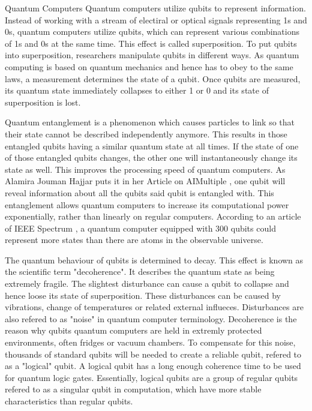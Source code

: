 \documentclass[aps,preprintnumbers,twocolumn]{revtex4}
\begin{document}
\begin{section}{Quantum Computers}
Quantum computers utilize qubits to represent information. 
Instead of working with a stream of electiral or optical signals representing 1s and 0s, 
quantum computers utilize qubits, which can represent various combinations of 1s and 0s at the same time. 
This effect is called superposition. To put qubits into superposition, 
researchers manipulate qubits in different ways. As quantum computing is based on quantum mechanics and hence has to obey to the same laws, 
a measurement determines the state of a qubit. Once qubits are measured, 
its quantum state immediately collapses to either 1 or 0 and its state of superposition is lost.

Quantum entanglement is a phenomenon which causes particles to link so that their state cannot be described independently anymore.
This results in those entangled qubits having a similar quantum state at all times.
If the state of one of those entangled qubits changes,
the other one will instantaneously change its state as well. This improves the processing speed of quantum computers. As Alamira Jouman Hajjar puts it in her Article on AIMultiple \cite{AIMultiple}, one qubit will reveal information about all the qubits said qubit is entangled with.
This entanglement allows quantum computers to increase its computational power exponentially,
rather than linearly on regular computers.
According to an article of IEEE Spectrum \cite{IEEE}, a quantum computer equipped with 300 qubits could represent more states than there are atoms in the observable universe.

The quantum behaviour of qubits is determined to decay.
This effect is known as the scientific term "decoherence".
It describes the quantum state as being extremely fragile.
The slightest disturbance can cause a qubit to collapse and hence loose its state of superposition.
These disturbances can be caused by vibrations, change of temperatures or related external influeces.
Disturbances are also refered to as "noise" in quantum computer terminology.
Decoherence is the reason why qubits quantum computers are held in extremly protected environments, 
often fridges or vacuum chambers.
To compensate for this noise, 
thousands of standard qubits will be needed to create a reliable qubit, 
refered to as a "logical" qubit. 
A logical qubit has a long enough coherence time to be used for quantum logic gates. 
Essentially, logical qubits are a group of regular qubits refered to as a singular qubit in computation, 
which have more stable characteristics than regular qubits.


\end{section}
\end{document}
